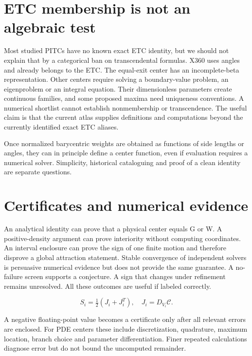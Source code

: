 \documentclass[11pt,oneside,openany]{book}
\newcommand{\TC}{\mathcal C}\newcommand{\mean}{\operatorname{mean}}
\begin{document}
\section{ETC membership is not an algebraic test}\label{sec:slide73}

Most studied PITCs have no known exact ETC identity, but we should not explain that by a categorical ban on transcendental formulas. X360 uses angles and already belongs to the ETC. The equal-exit center has an incomplete-beta representation. Other centers require solving a boundary-value problem, an eigenproblem or an integral equation. Their dimensionless parameters create continuous families, and some proposed maxima need uniqueness conventions. A numerical shortlist cannot establish nonmembership or transcendence. The useful claim is that the current atlas supplies definitions and computations beyond the currently identified exact ETC aliases.


Once normalized barycentric weights are obtained as functions of side lengths or angles, they can in principle define a center function, even if evaluation requires a numerical solver. Simplicity, historical cataloguing and proof of a clean identity are separate questions.



\section{Certificates and numerical evidence}\label{sec:slide74}

An analytical identity can prove that a physical center equals G or W. A positive-density argument can prove interiority without computing coordinates. An interval enclosure can prove the sign of one finite motion and therefore disprove a global attraction statement. Stable convergence of independent solvers is persuasive numerical evidence but does not provide the same guarantee. A no-failure screen supports a conjecture. A sign that changes under refinement remains unresolved. All these outcomes are useful if labeled correctly.


\[S_i=\tfrac12(J_i+J_i^T),\quad J_i=D_{V_i}\TC.\]



A negative floating-point value becomes a certificate only after
all relevant errors are enclosed. For PDE centers these include
discretization, quadrature, maximum location, branch choice and
parameter differentiation. Finer repeated calculations diagnose
error but do not bound the uncomputed remainder.
\end{document}
